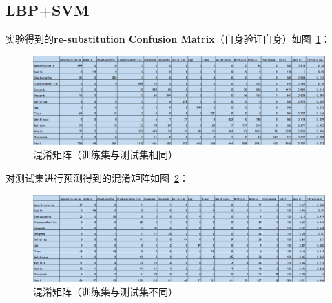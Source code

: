 \documentclass[12pt]{article}
\begin{document}
\subsection{LBP+SVM}

实验得到的\textbf{re-substitution Confusion Matrix}（自身验证自身）如图~\ref{fig: Train-CM-LBP-SVM}：
\begin{figure}[!ht]
\centering
\includegraphics[width=1.0\linewidth]{Train-CM-LBP-SVM}
\caption{混淆矩阵（训练集与测试集相同）}
\label{fig: Train-CM-LBP-SVM}
\end{figure}

对测试集进行预测得到的混淆矩阵如图~\ref{fig: Test-CM-LBP-SVM}：
\begin{figure}[!ht]
\centering
\includegraphics[width=1.0\linewidth]{Test-CM-LBP-SVM}
\caption{混淆矩阵（训练集与测试集不同）}
\label{fig: Test-CM-LBP-SVM}
\end{figure}



\end{document}
